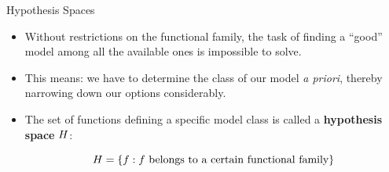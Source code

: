 \documentclass[11pt,compress,t,notes=noshow, xcolor=table]{beamer}
\begin{document}

\begin{vbframe}{Hypothesis Spaces}

\begin{itemize}

  \item Without restrictions on the functional family, the task of finding a 
  \enquote{good} model among all the available ones is impossible to solve.
  
  \item This means: we have to determine the class of our model \emph{a priori}, 
  thereby narrowing down our options considerably.
  
  \item The set of functions defining a specific model class is called a 
  \textbf{hypothesis space} $H$:
  
  $$H = \{f: f \text{ belongs to a certain functional family}\}$$

\end{itemize}  

\end{vbframe}

\end{document}
